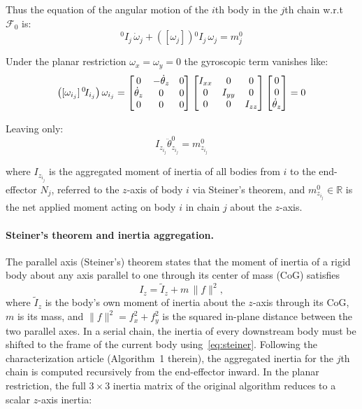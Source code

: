 Thus the equation of the angular motion of the $i$th body in the $j$th chain w.r.t $\mathcal{F}_{0}$ is:
\begin{equation}
    {}^{0}\!I_j \, \dot{\omega}_j + \left( [\omega_j] \right) {}^{0}\!I_j \, \omega_j  = m_j^0
\end{equation}

Under the planar restriction $\omega_x = \omega_y = 0$ the gyroscopic term vanishes like:
\begin{equation}
    \left([\omega_{i_j}]\,{}^0\!I_{i_j}\right)\omega_{i_j}
    =
    \begin{bmatrix}
        0 & -\dot{\theta}_z & 0 \\
        \dot{\theta}_z & 0 & 0 \\
        0 & 0 & 0
    \end{bmatrix}
    \begin{bmatrix}
        I_{xx} & 0 & 0 \\
        0 & I_{yy} & 0 \\
        0 & 0 & I_{zz}
    \end{bmatrix}
    \begin{bmatrix}
        0 \\
        0 \\
        \dot{\theta}_z
    \end{bmatrix}
    = 0
    \notag
\end{equation}

Leaving only:
\begin{equation}
    I_{z_{i_j}}\ddot{\theta}^{0}_{z_{i_j}} = m^0_{z_{i_j}}
\end{equation}

where $I_{z_{i_j}}$ is the aggregated moment of inertia of all bodies from $i$ to the end-effector $N_j$, referred to the $z$-axis of body $i$ via Steiner's theorem, and $m^0_{z_{i_j}} \in \mathbb{R}$ is the net applied moment acting on body $i$ in chain $j$ about the $z$-axis.

\paragraph{Steiner's theorem and inertia aggregation.}
The parallel axis (Steiner's) theorem states that the moment of inertia of a rigid body about any axis parallel to one through its center of mass (CoG) satisfies
\begin{equation} \label{eq:steiner}
    I_z = \tilde{I}_z + m\,\|f\|^2,
\end{equation}
where $\tilde{I}_z$ is the body's own moment of inertia about the $z$-axis through its CoG, $m$ is its mass, and $\|f\|^2 = f_x^2 + f_y^2$ is the squared in-plane distance between the two parallel axes. In a serial chain, the inertia of every downstream body must be shifted to the frame of the current body using~\eqref{eq:steiner}. Following the characterization article\cite{Al-Rawashdeh2022_Caracterization} (Algorithm~1 therein), the aggregated inertia for the $j$th chain is computed recursively from the end-effector inward. In the planar restriction, the full $3\times3$ inertia matrix of the original algorithm reduces to a scalar $z$-axis inertia:

